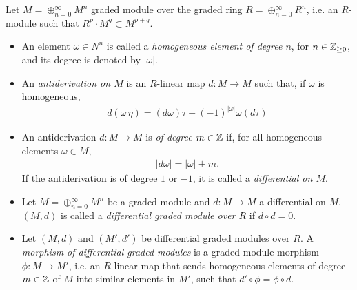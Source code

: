 \begin{definition}\label{defnDiffGModule}
    Let $M = \oplus_{n = 0}^\infty M^n$ graded module over the graded ring $R = \oplus_{n = 0}^\infty R^n$, i.e. an $R$-module such that $R^p \cdot M^q \subset M^{p+q}$.
    
    \begin{itemize}
    
    \item An element $\omega \in N^n$ is called a \emph{homogeneous element of degree $n$}, for $n \in \mathbb{Z}_{\geq 0}$, and its degree is denoted by $|\omega|$.
    
    \item An \emph{antiderivation on $M$} is an $R$-linear map $d: M \to M$ such that, if $\omega$ is homogeneous, 
    \begin{align*}
        d(\omega \, \eta) = (d\omega)\tau + (-1)^{|\omega|} \omega (d\tau)
    \end{align*}
    
    \item An antiderivation $d: M \to M$ is \emph{of degree $m \in \mathbb{Z}$} if, for all homogeneous elements $\omega \in M$,
    \begin{align*}
        |d\omega| = |\omega| + m.
    \end{align*}
    If the antiderivation is of degree $1$ or $-1$, it is called a \emph{differential on $M$}.
    
    \item Let $M = \oplus_{n = 0}^\infty M^n$ be a graded module and $d: M \to M$ a differential on $M$. $(M, d)$ is called a \emph{differential graded module over $R$} if $d \circ d = 0$.
    
    \item Let $(M, d)$ and $(M', d')$ be differential graded modules over $R$. A \emph{morphism of differential graded modules} is a graded module morphism $\phi: M \to M'$, i.e. an $R$-linear map that sends homogeneous elements of degree $m \in \mathbb{Z}$ of $M$ into similar elements in $M'$, such that $d' \circ \phi = \phi \circ d$.
    
    \end{itemize}
    
\end{definition}

